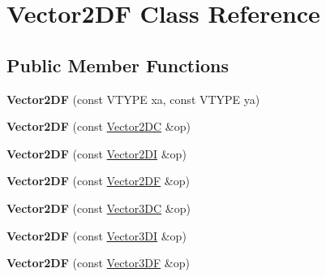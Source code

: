 \hypertarget{class_vector2_d_f}{\section{Vector2\+D\+F Class Reference}
\label{class_vector2_d_f}
}
\subsection*{Public Member Functions}
\begin{DoxyCompactItemize}
\item 
\hypertarget{class_vector2_d_f_a34d029b099e56fb44d49888422dd3677}{{\bfseries Vector2\+D\+F} (const V\+T\+Y\+P\+E xa, const V\+T\+Y\+P\+E ya)}\label{class_vector2_d_f_a34d029b099e56fb44d49888422dd3677}

\item 
\hypertarget{class_vector2_d_f_a850a6d45988aa03b7b65d82608a41d34}{{\bfseries Vector2\+D\+F} (const \hyperlink{class_vector2_d_c}{Vector2\+D\+C} \&op)}\label{class_vector2_d_f_a850a6d45988aa03b7b65d82608a41d34}

\item 
\hypertarget{class_vector2_d_f_adb7f63babbdfd8ba93c0ccf44ad702b1}{{\bfseries Vector2\+D\+F} (const \hyperlink{class_vector2_d_i}{Vector2\+D\+I} \&op)}\label{class_vector2_d_f_adb7f63babbdfd8ba93c0ccf44ad702b1}

\item 
\hypertarget{class_vector2_d_f_a89efcc4bb7b25248baf83fef8df0e023}{{\bfseries Vector2\+D\+F} (const \hyperlink{class_vector2_d_f}{Vector2\+D\+F} \&op)}\label{class_vector2_d_f_a89efcc4bb7b25248baf83fef8df0e023}

\item 
\hypertarget{class_vector2_d_f_ab422b53917ffb190a2290dbdcc095eb0}{{\bfseries Vector2\+D\+F} (const \hyperlink{class_vector3_d_c}{Vector3\+D\+C} \&op)}\label{class_vector2_d_f_ab422b53917ffb190a2290dbdcc095eb0}

\item 
\hypertarget{class_vector2_d_f_ad986c5be09512865cb547f5bd6c10f94}{{\bfseries Vector2\+D\+F} (const \hyperlink{class_vector3_d_i}{Vector3\+D\+I} \&op)}\label{class_vector2_d_f_ad986c5be09512865cb547f5bd6c10f94}

\item 
\hypertarget{class_vector2_d_f_a901ef588897e5ab22492cdffd04bb615}{{\bfseries Vector2\+D\+F} (const \hyperlink{class_vector3_d_f}{Vector3\+D\+F} \&op)}\label{class_vector2_d_f_a901ef588897e5ab22492cdffd04bb615}


\end{DoxyCompactItemize}

